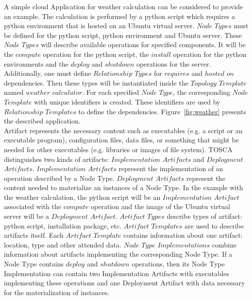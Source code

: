A simple cloud Application for weather calculation can be considered to provide an example. 
The calculation is performed by a python script which requires a python environment that is hosted on an Ubuntu virtual server.
$Node$ $Types$ must be defined for the python script, python environment and Ubuntu server.  
These $Node$ $Types$ will describe available operations for specified components.
It will be the $compute$ operation for the python script, the $install$ operation for the python environments and the $deploy$ and $shutdown$ operations for the server.
Additionally, one must define $Relationship$ $Types$ for $requires$ and $hosted$ $on$ dependencies.
Then these types will be instantiated inside the $Topology$ $Template$ named $weather$ $calculator$.
For each specified $Node$ $Type$, the corresponding $Node$ $Template$ with unique identifiers is created.
These identifiers are used by $Relationship$ $Templates$ to define the dependencies.
Figure~\ref{fig:weather} presents the described application. \\
Artifact represents the necessary content such as executables (e.g. a script or an executable program), configuration files, data files, or something that might be needed for other executables (e.g. libraries or images of file system).
TOSCA distinguishes two kinds of artifacts: $Implementation$ $Artifacts$ and $Deployment$ $Artifacts$.
$Implementation$ $Artifacts$ represent the implementation of an operation described by a Node Type.
$Deployment$ $Artifacts$ represent the content needed to materialize an instances of a Node Type.
In the example with the weather calculation, the python script will be an $Implementation$ $Artifact$ associated with the $compute$ operation and the image of the Ubuntu virtual server will be a $Deployment$ $Artifact$.
$Artifact$ $Types$ describe types of artifact: python script, installation package, etc.
$Artifact$ $Templates$ are used to describe artifacts itself.
Each $Artifact$ $Template$ contains information about one artifact: location, type and other attended data. 
$Node$ $Type$ $Implementations$ combine information about artifacts implementing the corresponding Node Type.
If a Node Type contains $deploy$ and $shutdown$ operations, then its Node Type Implementation can contain two Implementation Artifacts with executables implementing these operations and one Deployment Artifact with data necessary for the materialization of instances. %
